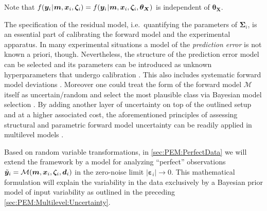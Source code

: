 Note that \(f (\bm{y}_i {\:\!}|{\:\!} \bm{m}, \allowbreak \bm{x}_i,\bm{\zeta}_i) = f (\bm{y}_i {\:\!}|{\:\!} \bm{m},\bm{x}_i,\bm{\zeta}_i,\bm{\theta}_{\bm{X}})\) is independent of \(\bm{\theta}_{\bm{X}}\).
\par %
The specification of the residual model, i.e.\ quantifying the parameters of \(\bm{\Sigma}_i\), is an essential part of calibrating the forward model and the experimental apparatus.
In many experimental situations a model of the \textit{prediction error} is not known a priori, though.
Nevertheless, the structure of the prediction error model can be selected \cite{Bayesian:Simoen2013:a} and
its parameters can be introduced as unknown hyperparameters that undergo calibration \cite{Bayesian:Zhang2011}.
This also includes systematic forward model deviations \cite{Bayesian:Kennedy2001,Bayesian:Arendt2012:a}.
Moreover one could treat the form of the forward model \(\mathcal{M}\) itself as uncertain/random \cite{Bayesian:Droguett2008,Bayesian:Park2014}
and select the most plausible class via Bayesian model selection \cite{Bayesian:Beck2004,Bayesian:Yuen2010:b}.
By adding another layer of uncertainty on top of the outlined setup and at a higher associated cost,
the aforementioned principles of assessing structural and parametric forward model uncertainty can be readily applied in multilevel models \cite{Bayesian:Draper1995}.
\par %
Based on random variable transformations, in \cref{sec:PEM:PerfectData} we will extend the framework by a model
for analyzing ``perfect'' observations \(\tilde{\bm{y}}_i = \mathcal{M}(\bm{m},\bm{x}_i,\bm{\zeta}_i,\bm{d}_i)\) in the zero-noise limit \(\lvert \bm{\varepsilon}_i \rvert \rightarrow 0\).
This mathematical formulation will explain the variability in the data exclusively by a Bayesian prior model of input variability as outlined in the preceding \cref{sec:PEM:Multilevel:Uncertainty}.

